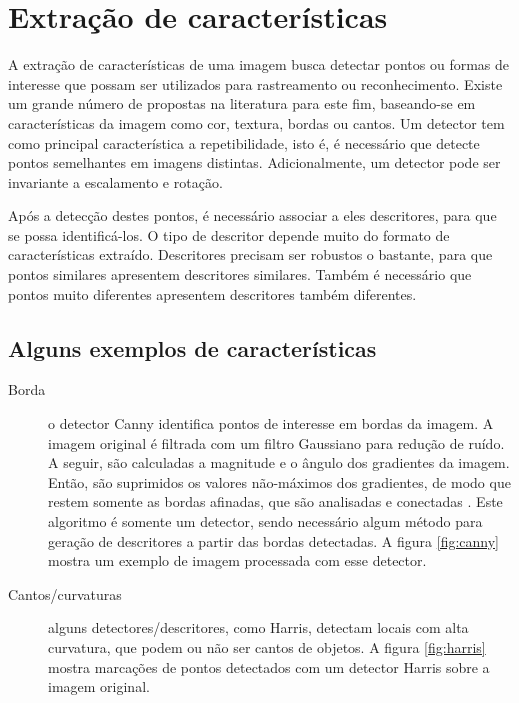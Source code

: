 \documentclass[a4paper]{coursepaper-br}
\begin{document}
\section{Extração de características}
\label{sec:featdet}

A extração de características de uma imagem busca detectar pontos ou
formas de interesse que possam ser utilizados para rastreamento ou
reconhecimento. Existe um grande número de propostas na literatura
para este fim, baseando-se em características da imagem como cor,
textura, bordas ou cantos. Um detector tem como principal
característica a repetibilidade, isto é, é necessário que detecte
pontos semelhantes em imagens distintas. Adicionalmente, um detector
pode ser invariante a escalamento e rotação.

Após a detecção destes pontos, é necessário associar a eles
descritores, para que se possa identificá-los. O tipo de descritor
depende muito do formato de características extraído. Descritores
precisam ser robustos o bastante, para que pontos similares apresentem
descritores similares. Também é necessário que pontos muito diferentes
apresentem descritores também diferentes.

\subsection{Alguns exemplos de características}

\begin{description}
 \item[Borda] o detector Canny identifica pontos de interesse em
   bordas da imagem. A imagem original é filtrada com um filtro
   Gaussiano para redução de ruído. A seguir, são calculadas a
   magnitude e o ângulo dos gradientes da imagem. Então, são
   suprimidos os valores não-máximos dos gradientes, de modo que
   restem somente as bordas afinadas, que são analisadas e conectadas
   \cite{Gonzalez2007}. Este algoritmo é somente um detector, sendo
   necessário algum método para geração de descritores a partir das
   bordas detectadas. A figura \ref{fig:canny} mostra um exemplo de
   imagem processada com esse detector.
 \item[Cantos/curvaturas] alguns detectores/descritores, como Harris,
   detectam locais com alta curvatura, que podem ou não ser cantos de
   objetos. A figura \ref{fig:harris} mostra marcações de pontos
   detectados com um detector Harris sobre a imagem original.
\end{description}
\end{document}
